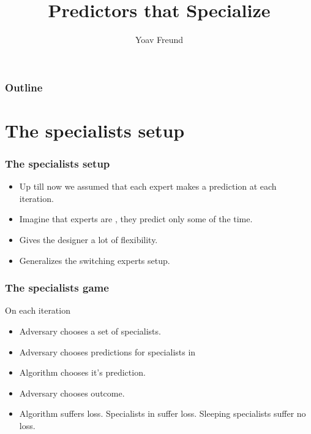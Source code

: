 \documentclass{beamer}
\title [Specialists] %
{Predictors that Specialize}
\author[Freund] %
{Yoav Freund}
\institute[Universities of Somewhere and Elsewhere] %
\begin{document}
\begin{small}
\iffalse %
\fi %

\begin{frame}
  \titlepage
\end{frame}

\begin{frame}
  \frametitle{Outline}
  \tableofcontents[pausesections]
\end{frame}

\section{The specialists setup}

\begin{frame}
\frametitle{The specialists setup}
\begin{itemize}
\item Up till now we assumed that each expert makes a prediction at each iteration.
\item Imagine that experts are , they predict only some of the time.
\item Gives the designer a lot of flexibility.
\item Generalizes the switching experts setup.
\end{itemize}
\end{frame}

\begin{frame}
\frametitle{The specialists game}
On each iteration 
\begin{itemize}
\item Adversary chooses a set  of  specialists.
\item Adversary chooses predictions for specialists in 
\item Algorithm chooses it's prediction.
\item Adversary chooses outcome.
\item Algorithm suffers loss. Specialists in  suffer loss. Sleeping specialists suffer no loss.
\end{itemize}
\end{frame}


\end{small}
\end{document}

